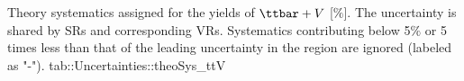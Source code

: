 {Theory systematics assigned for the yields of $\ttbar+V$ [$\%$]. The uncertainty is shared by SRs and corresponding VRs. Systematics contributing below 5$\%$ or 5 times less than that of the leading uncertainty in the region are ignored (labeled as "-"). }
{tab::Uncertainties::theoSys_ttV}

